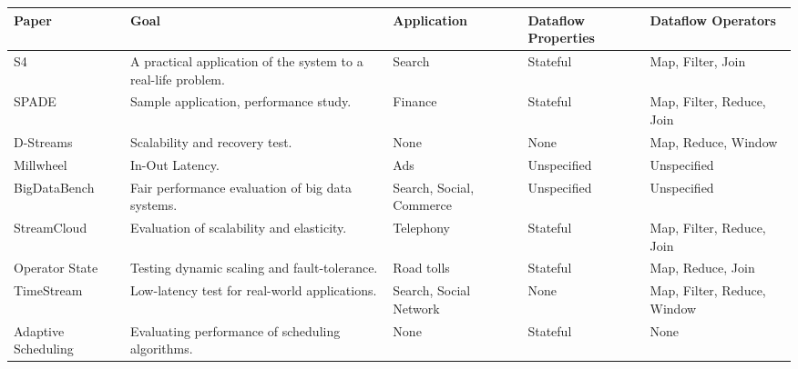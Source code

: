 \begin{table}[H]
  \centering
  {
    \scriptsize
    \hspace*{-1cm}
    \begin{tabular}{|p{3cm}|p{4cm}|p{3cm}|p{2.5cm}|p{2.5cm}|}
      \hline
      Paper & Goal & Application & Dataflow Properties & Dataflow Operators
      \\\hline
      
      S4\cite{s4}
      & A practical application of the system to a real-life problem.
      & Search
      & Stateful
      & Map, Filter, Join
      \\\hline
      
      SPADE\cite{spade}
      & Sample application, performance study.
      & Finance
      & Stateful
      & Map, Filter, Reduce, Join
      \\\hline

      D-Streams\cite{discretized}
      & Scalability and recovery test.
      & None
      & None
      & Map, Reduce, Window
      \\\hline

      Millwheel\cite{millwheel}
      & In-Out Latency.
      & Ads
      & Unspecified
      & Unspecified
      \\\hline

      BigDataBench\cite{bigdatabench}
      & Fair performance evaluation of big data systems.
      & Search, Social, Commerce
      & Unspecified
      & Unspecified
      \\\hline

      StreamCloud\cite{streamcloud}
      & Evaluation of scalability and elasticity.
      & Telephony
      & Stateful
      & Map, Filter, Reduce, Join
      \\\hline

      Operator State\cite{integrating}
      & Testing dynamic scaling and fault-tolerance.
      & Road tolls
      & Stateful
      & Map, Reduce, Join
      \\\hline

      TimeStream\cite{timestream}
      & Low-latency test for real-world applications.
      & Search, Social Network
      & None
      & Map, Filter, Reduce, Window
      \\\hline

      Adaptive Scheduling\cite{storm}
      & Evaluating performance of scheduling algorithms.
      & None
      & Stateful
      & None
      \\\hline


\end{tabular}}
\end{table}
